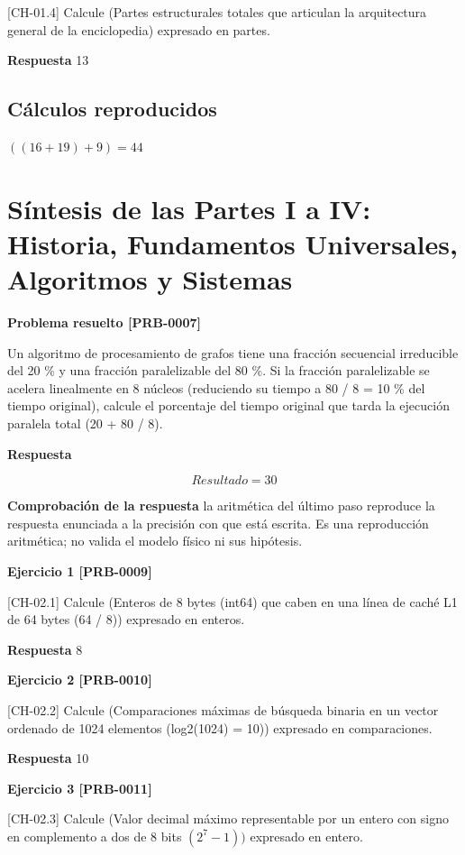 \documentclass{book}
\begin{document}
[CH-01.4] Calcule (Partes estructurales totales que articulan la arquitectura general de la enciclopedia) expresado en partes.

\noindent\textbf{Respuesta} 13

\subsection*{Cálculos reproducidos}

\(\left(\left(16+19\right)+9\right) = 44\)

\section{Síntesis de las Partes I a IV: Historia, Fundamentos Universales, Algoritmos y Sistemas}

\noindent\textbf{Problema resuelto [PRB-0007]}

Un algoritmo de procesamiento de grafos tiene una fracción secuencial irreducible del 20 \% y una fracción paralelizable del 80 \%. Si la fracción paralelizable se acelera linealmente en 8 núcleos (reduciendo su tiempo a 80 / 8 = 10 \% del tiempo original), calcule el porcentaje del tiempo original que tarda la ejecución paralela total (20 + 80 / 8).

\noindent\textbf{Respuesta}

\[
Resultado = 30
\]

\noindent\textbf{Comprobación de la respuesta} la aritmética del último paso reproduce la respuesta enunciada a la precisión con que está escrita. Es una reproducción aritmética; no valida el modelo físico ni sus hipótesis.

\noindent\textbf{Ejercicio 1 [PRB-0009]}

[CH-02.1] Calcule (Enteros de 8 bytes (int64) que caben en una línea de caché L1 de 64 bytes (64 / 8)) expresado en enteros.

\noindent\textbf{Respuesta} 8

\noindent\textbf{Ejercicio 2 [PRB-0010]}

[CH-02.2] Calcule (Comparaciones máximas de búsqueda binaria en un vector ordenado de 1024 elementos (log2(1024) = 10)) expresado en comparaciones.

\noindent\textbf{Respuesta} 10

\noindent\textbf{Ejercicio 3 [PRB-0011]}

[CH-02.3] Calcule (Valor decimal máximo representable por un entero con signo en complemento a dos de 8 bits \((2^7 - 1))\) expresado en entero.
\end{document}

